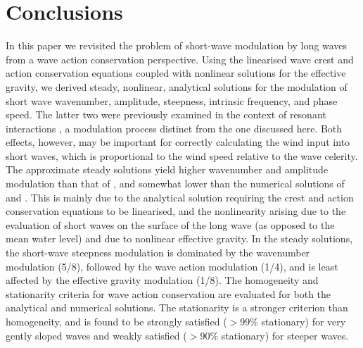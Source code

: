\documentclass[lineno]{jfm}
\begin{document}
\section{Conclusions}
\label{section:conclusions}

In this paper we revisited the problem of short-wave modulation by long waves
from a wave action conservation perspective.
Using the linearised wave crest and action conservation equations coupled with
nonlinear solutions for the effective gravity, we derived steady, nonlinear, analytical
solutions for the modulation of short wave wavenumber, amplitude, steepness,
intrinsic frequency, and phase speed.
The latter two were previously examined in the context of resonant interactions
\citep{longuet1962resonant,longuet1962phase}, a modulation process distinct from
the one discussed here.
Both effects, however, may be important for correctly calculating the wind input
into short waves, which is proportional to the wind speed relative to the wave
celerity.
The approximate steady solutions yield higher wavenumber and amplitude
modulation than that of \citet{longuet1960changes}, and somewhat lower than
the numerical solutions of \citet{longuet1987propagation} and
\citet{zhang1990evolution}.
This is mainly due to the analytical solution requiring the crest and action
conservation equations to be linearised, and the nonlinearity arising due
to the evaluation of short waves on the surface of the long wave (as opposed to
the mean water level) and due to nonlinear effective gravity.
In the steady solutions, the short-wave steepness modulation is dominated by
the wavenumber modulation (5/8), followed by the wave action modulation (1/4),
and is least affected by the effective gravity modulation (1/8).
The homogeneity and stationarity criteria for wave action conservation are
evaluated for both the analytical and numerical solutions.
The stationarity is a stronger criterion than homogeneity, and is found to be
strongly satisfied ($> 99\%$ stationary) for very gently sloped waves and weakly
satisfied ($> 90\%$ stationary) for steeper waves.
\end{document}
